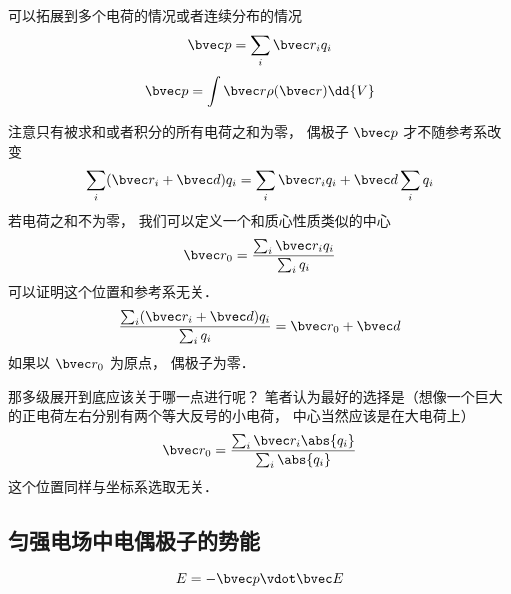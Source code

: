 

可以拓展到多个电荷的情况或者连续分布的情况
\begin{equation}
\bvec p = \sum_i \bvec r_i q_i
\end{equation}
\begin{equation}
\bvec p = \int \bvec r \rho(\bvec r) \dd{V}
\end{equation}

注意只有被求和或者积分的所有电荷之和为零， 偶极子 $\bvec p$ 才不随参考系改变
\begin{equation}
\sum_i (\bvec r_i + \bvec d) q_i = \sum_i \bvec r_i q_i + \bvec d \sum_i q_i
\end{equation}
若电荷之和不为零， 我们可以定义一个和质心性质类似的中心
\begin{equation}
\bvec r_0 = \frac{\sum_i \bvec r_i q_i}{\sum_i q_i}
\end{equation}
可以证明这个位置和参考系无关．
\begin{equation}
\frac{\sum_i (\bvec r_i + \bvec d) q_i}{\sum_i q_i} = \bvec r_0 + \bvec d
\end{equation}
如果以 $\bvec r_0$ 为原点， 偶极子为零．

那多级展开到底应该关于哪一点进行呢？ 笔者认为最好的选择是（想像一个巨大的正电荷左右分别有两个等大反号的小电荷， 中心当然应该是在大电荷上）
\begin{equation}
\bvec r_0 = \frac{\sum_i \bvec r_i \abs{q_i}}{\sum_i \abs{q_i}}
\end{equation}
这个位置同样与坐标系选取无关．

\subsection{匀强电场中电偶极子的势能}
\begin{equation}\label{eleDP2_eq1}
E = -\bvec p \vdot \bvec E
\end{equation}
